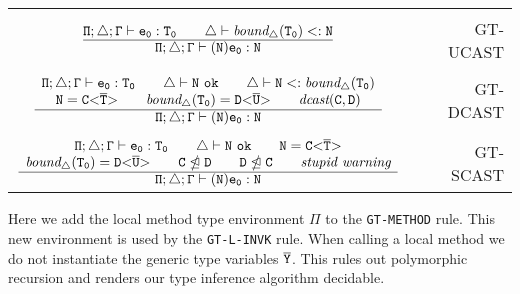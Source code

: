 {\begin{minipage}{\textwidth}
\begin{small}
\begin{tabularx}{\textwidth}{c X r}
& \\

$\frac{\displaystyle \mathtt{\Pi;\triangle;\Gamma \vdash e_0 : T_0 \quad \quad \triangle \vdash \textit{bound}_\triangle(T_0) <: N}}{\displaystyle \mathtt{\Pi;\triangle;\Gamma \vdash (N) e_0 : N}}
$ & & GT-UCAST \\

& \\

$ \ddfrac{\begin{array}{c}
  \mathtt{\environmentvdash e_0 : T_0 \quad \quad \triangle \vdash N\ \texttt{ok} \quad \quad \triangle \vdash N <: \textit{bound}_\triangle(T_0) } \\
  \mathtt{N = \exptype{C}{\ol{T}} \quad \quad \textit{bound}_\triangle(T_0) = \exptype{D}{\ol{U}}  \quad \quad \textit{dcast}(C,D)}
\end{array}
}{\mathtt{\environmentvdash (N) e_0 : N}}$ & & GT-DCAST \\

& \\

$\ddfrac{\begin{array}{c}
  \mathtt{\environmentvdash e_0 : T_0 \quad \quad \triangle \vdash N\ \texttt{ok} \quad \quad N = \exptype{C}{\ol{T}}  } \\
  \mathtt{\textit{bound}_\triangle(T_0) = \exptype{D}{\ol{U}} \quad \quad C \ntrianglelefteq D \quad \quad D \ntrianglelefteq C \quad \quad \textit{stupid warning}}
\end{array}}
{\mathtt{\environmentvdash (N) e_0 : N}}
$ & & GT-SCAST 
\end{tabularx}
\end{small}
\end{minipage}
}

\smallskip

Here we add the local method type environment $\mathtt{\Pi}$ to the \texttt{GT-METHOD} rule.
This new environment is used by the \texttt{GT-L-INVK} rule.
When calling a local method we do not instantiate the generic type variables $\mathtt{\overline{\tt Y}}$.
This rules out polymorphic recursion and renders our type inference algorithm decidable.

\smallskip

